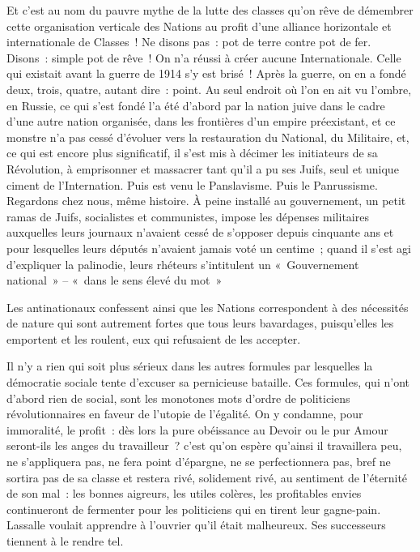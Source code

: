 \documentclass[french,twoside]{book} %
\begin{document}
Et c’est au nom du pauvre mythe de la lutte des classes qu’on rêve de démembrer cette organisation verticale des Nations au profit d’une alliance horizontale et internationale de Classes ! Ne disons pas : pot de terre contre pot de fer. Disons : simple pot de rêve ! On n’a réussi à créer aucune Internationale. Celle qui existait avant la guerre de 1914 s’y est brisé ! Après la guerre, on en a fondé deux, trois, quatre, autant dire : point. Au seul endroit où l’on en ait vu l’ombre, en Russie, ce qui s’est fondé l’a été d’abord par la nation juive dans le cadre d’une autre nation organisée, dans les frontières d’un empire préexistant, et ce monstre n’a pas cessé d’évoluer vers la restauration du National, du Militaire, et, ce qui est encore plus significatif, il s’est mis à décimer les initiateurs de sa Révolution, à emprisonner et massacrer tant qu’il a pu ses Juifs, seul et unique ciment de l’Internation. Puis est venu le Panslavisme. Puis le Panrussisme. Regardons chez nous, même histoire. À peine installé au gouvernement, un petit ramas de Juifs, socialistes et communistes, impose les dépenses militaires auxquelles leurs journaux n’avaient cessé de s’opposer depuis cinquante ans et pour lesquelles leurs députés n’avaient jamais voté un centime ; quand il s’est agi d’expliquer la palinodie, leurs rhéteurs s’intitulent un « Gouvernement national » – « dans le sens élevé du mot »\par
Les antinationaux confessent ainsi que les Nations correspondent à des nécessités de nature qui sont autrement fortes que tous leurs bavardages, puisqu’elles les emportent et les roulent, eux qui refusaient de les accepter.\par
Il n’y a rien qui soit plus sérieux dans les autres formules par lesquelles la démocratie sociale tente d’excuser sa pernicieuse bataille. Ces formules, qui n’ont d’abord rien de social, sont les monotones mots d’ordre de politiciens révolutionnaires en faveur de l’utopie de l’égalité. On y condamne, pour immoralité, le profit : dès lors la pure obéissance au Devoir ou le pur Amour seront-ils les anges du travailleur ? c’est qu’on espère qu’ainsi il travaillera peu, ne s’appliquera pas, ne fera point d’épargne, ne se perfectionnera pas, bref ne sortira pas de sa classe et restera rivé, solidement rivé, au sentiment de l’éternité de son mal : les bonnes aigreurs, les utiles colères, les profitables envies continueront de fermenter pour les politiciens qui en tirent leur gagne-pain. Lassalle voulait apprendre à l’ouvrier qu’il était malheureux. Ses successeurs tiennent à le rendre tel.\par
\end{document}
